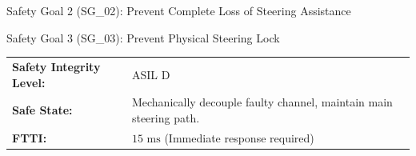 \begin{asilbox}{Safety Goal 2 (SG\_02): Prevent Complete Loss of Steering Assistance}
\end{asilbox}

\begin{asilbox}{Safety Goal 3 (SG\_03): Prevent Physical Steering Lock}
    \begin{tabular}{p{3cm} l}
        \textbf{Safety Integrity Level:} & ASIL D \\
        \textbf{Safe State:} & Mechanically decouple faulty channel, maintain main steering path. \\
        \textbf{FTTI:} & \(15\text{~ms}\) (Immediate response required)
    \end{tabular}
\end{asilbox}
